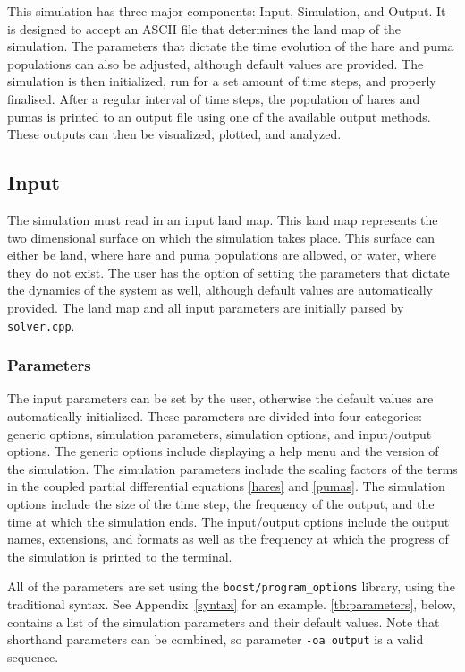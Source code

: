 \documentclass[a4paper,11pt]{article}
\begin{document}
{This simulation has three major components: Input, Simulation, and Output.  
It is designed to accept an ASCII file that determines the land map of the simulation.
The parameters that dictate the time evolution of the hare and puma populations can also be adjusted, although default values are provided.  
The simulation is then initialized, run for a set amount of time steps, and properly finalised.  
After a regular interval of time steps, the population of hares and pumas is printed to an output file using one of the available output methods.  
These outputs can then be visualized, plotted, and analyzed.

\subsection{Input}

The simulation must read in an input land map.  
This land map represents the two dimensional surface on which the simulation takes place.  
This surface can either be land, where hare and puma populations are allowed, or water, where they do not exist.  
The user has the option of setting the parameters that dictate the dynamics of the system as well, although default values are automatically provided.  
The land map and all input parameters are initially parsed by \texttt{solver.cpp}.

\subsubsection{Parameters}\label{params}

The input parameters can be set by the user, otherwise the default values are automatically initialized.  
These parameters are divided into four categories: generic options, simulation parameters, simulation options, and input/output options.
The generic options include displaying a help menu and the version of the simulation.  
The simulation parameters include the scaling factors of the terms in the coupled partial differential equations \eqref{hares} and \eqref{pumas}.  
The simulation options include the size of the time step, the frequency of the output, and the time at which the simulation ends.  
The input/output options include the output names, extensions, and formats as well as the frequency at which the progress of the simulation is printed to the terminal.  

All of the parameters are set using the \texttt{boost/program\_options} library, using the traditional syntax. 
See Appendix~\ref{syntax} for an example. \ref{tb:parameters}, below, contains a list of the simulation parameters and their default values. 
Note that shorthand parameters can be combined, so parameter \texttt{-oa output} is a valid sequence.

}
\end{document}

